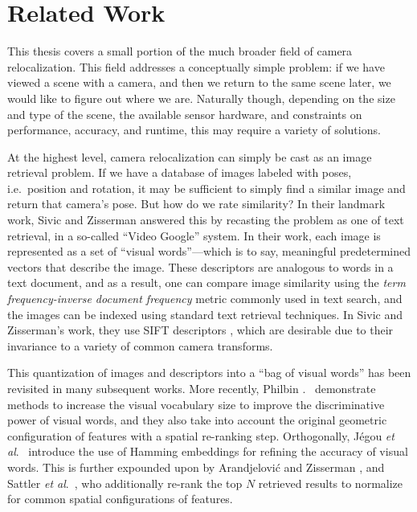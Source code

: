 

\chapter{Related Work}



This thesis covers a small portion of the much broader field of camera relocalization. This field addresses a conceptually simple problem: if we have viewed a scene with a camera, and then we return to the same scene later, we would like to figure out where we are. Naturally though, depending on the size and type of the scene, the available sensor hardware, and constraints on performance, accuracy, and runtime, this may require a variety of solutions.

At the highest level, camera relocalization can simply be cast as an image retrieval problem. If we have a database of images labeled with poses, i.e.\ position and rotation, it may be sufficient to simply find a similar image and return that camera's pose. But how do we rate similarity? In their landmark work, Sivic and Zisserman \cite{sivic2003video} answered this by recasting the problem as one of text retrieval, in a so-called ``Video Google'' system. In their work, each image is represented as a set of ``visual words''---which is to say, meaningful predetermined vectors that describe the image. These descriptors are analogous to words in a text document, and as a result, one can compare image similarity using the \textit{term frequency-inverse document frequency} metric commonly used in text search, and the images can be indexed using standard text retrieval techniques. In Sivic and Zisserman's work, they use SIFT descriptors \cite{lowe1999object}, which are desirable due to their invariance to a variety of common camera transforms.

This quantization of images and descriptors into a ``bag of visual words'' has been revisited in many subsequent works. More recently, Philbin .\ \cite{philbin2007object} demonstrate methods to increase the visual vocabulary size to improve the discriminative power of visual words, and they also take into account the original geometric configuration of features with a spatial re-ranking step. Orthogonally, J{\'e}gou \textit{et al}.\ \cite{jegou2008hamming} introduce the use of Hamming embeddings for refining the accuracy of visual words. This is further expounded upon by Arandjelovi\'c and Zisserman \cite{Arandjelovic14a}, and Sattler \textit{et al}.\ \cite{Sattler16CVPR}, who additionally re-rank the top $N$ retrieved results to normalize for common spatial configurations of features.

